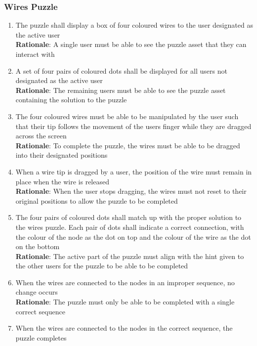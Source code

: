 \documentclass[12pt]{article}
\begin{document}
\subsubsection{Wires Puzzle}

\begin{enumerate}[label=WP\arabic*., series=WiresPuzzle ]
        \item The puzzle shall display a box of four coloured wires to the user designated as the active user \\
        \textbf{Rationale}: A single user must be able to see the puzzle asset that they can interact with
        \item A set of four pairs of coloured dots shall be displayed for all users not designated as the active user \\
        \textbf{Rationale}: The remaining users must be able to see the puzzle asset containing the solution to the puzzle
        \item The four coloured wires must be able to be manipulated by the user such that their tip follows the movement of the users finger while they are dragged across the screen \\
        \textbf{Rationale}: To complete the puzzle, the wires must be able to be dragged into their designated positions
        \item When a wire tip is dragged by a user, the position of the wire must remain in place when the wire is released \\
        \textbf{Rationale}: When the user stops dragging, the wires must not reset to their original positions to allow the puzzle to be completed
        \item  The four pairs of coloured dots shall match up with the proper solution to the wires puzzle. Each pair of dots shall indicate a correct connection, with the colour of the node as the dot on top and the colour of the wire as the dot on the bottom\\
        \textbf{Rationale}: The active part of the puzzle must align with the hint given to the other users for the puzzle to be able to be completed 
        \item  When the wires are connected to the nodes in an improper sequence, no change occurs \\
        \textbf{Rationale}: The puzzle must only be able to be completed with a single correct sequence
        \item  When the wires are connected to the nodes in the correct sequence, the puzzle completes \\

\end{enumerate}
\end{document}
